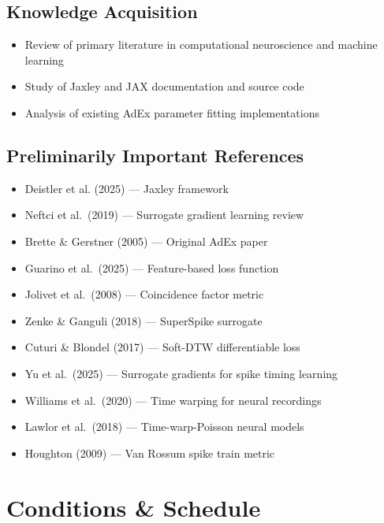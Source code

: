 \documentclass{article}
\begin{document}
\subsection{Knowledge Acquisition}

\begin{itemize}
    \item Review of primary literature in computational neuroscience and machine learning
    \item Study of Jaxley and JAX documentation and source code
    \item Analysis of existing AdEx parameter fitting implementations
\end{itemize}

\subsection{Preliminarily Important References}

\begin{itemize}
    \item Deistler et al. (2025) \cite{Deistler2025} --- Jaxley framework
    \item Neftci et al.\ (2019) \cite{Neftci2019} --- Surrogate gradient learning review
    \item Brette \& Gerstner (2005) \cite{Brette2005} --- Original AdEx paper
    \item Guarino et al.\ (2025) \cite{Guarino2025} --- Feature-based loss function
    \item Jolivet et al.\ (2008) \cite{Jolivet2008} --- Coincidence factor metric
    \item Zenke \& Ganguli (2018) \cite{Zenke2018} --- SuperSpike surrogate
    \item Cuturi \& Blondel (2017) \cite{Cuturi2017} --- Soft-DTW differentiable loss
    \item Yu et al.\ (2025) \cite{Yu2025} --- Surrogate gradients for spike timing learning
    \item Williams et al.\ (2020) \cite{Williams2020} --- Time warping for neural recordings
    \item Lawlor et al.\ (2018) \cite{Lawlor2018} --- Time-warp-Poisson neural models
    \item Houghton (2009) \cite{Houghton2009} --- Van Rossum spike train metric
\end{itemize}

\section{Conditions \& Schedule}
\end{document}
